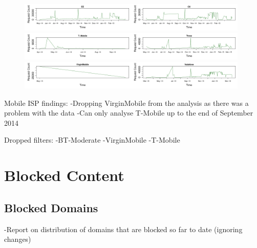 \documentclass{bmcart}
\begin{document}
\begin{figure}[h!]
\caption{}
\includegraphics[width=0.49\textwidth]{imgs/EE-ts-requests.pdf}\includegraphics[width=0.49\textwidth]{imgs/O2-ts-requests.pdf}
\includegraphics[width=0.49\textwidth]{imgs/T-Mobile-ts-requests.pdf}\includegraphics[width=0.49\textwidth]{imgs/Three-ts-requests.pdf}
\includegraphics[width=0.49\textwidth]{imgs/VirginMobile-ts-requests.pdf}\includegraphics[width=0.49\textwidth]{imgs/Vodafone-ts-requests.pdf}
\label{fig:broadband-requests}
\end{figure}

Mobile ISP findings:
-Dropping VirginMobile from the analysis as there was a problem with the data
-Can only analyse T-Mobile up to the end of September 2014

Dropped filters:
-BT-Moderate
-VirginMobile
-T-Mobile



\clearpage
\section*{Blocked Content}

\subsection*{Blocked Domains}
-Report on distribution of domains that are blocked so far to date (ignoring changes)
\end{document}
